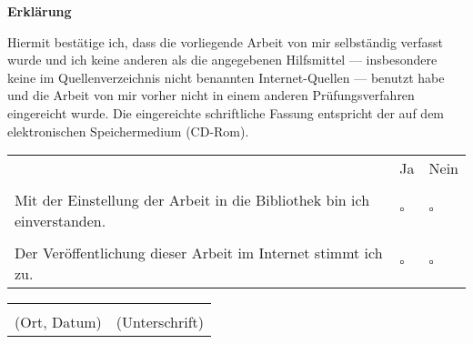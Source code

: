 \thispagestyle{empty}
\clearpage
\vspace*{\fill}
	\begin{center}
		\begin{minipage}{1\textwidth}
			\huge
			\textbf{Erklärung}

			\vspace{0.1\textwidth}
			\normalsize
			Hiermit bestätige ich, dass die vorliegende Arbeit von mir selbständig verfasst wurde und ich keine anderen als die angegebenen Hilfsmittel --- insbesondere keine im Quellenverzeichnis nicht benannten Internet-Quellen --- benutzt habe und die Arbeit von mir vorher nicht in einem anderen Prüfungsverfahren eingereicht wurde. Die eingereichte schriftliche Fassung entspricht der auf dem elektronischen Speichermedium (CD-Rom).

			\vspace{0.1\textwidth}
			\begin{tabularx}{\textwidth}{@{} l l l @{}}
													& Ja         & Nein      \\
													&	     &		 \\
				Mit der Einstellung der Arbeit in die Bibliothek bin ich einverstanden. & $\square$  & $\square$ \\
													&	     &		 \\
				Der Veröffentlichung dieser Arbeit im Internet stimmt ich zu.		& $\square$  & $\square$ \\
			\end{tabularx}

			\vspace{0.1\textwidth}
			\begin{tabularx}{\textwidth}{@{} X X @{}}
				\dotfill     & \dotfill       \\ 
				(Ort, Datum) & (Unterschrift)
			\end{tabularx}
		\end{minipage}
	\end{center}
\vfill
\clearpage
